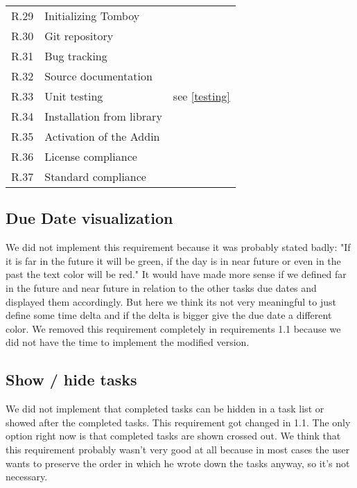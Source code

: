 \begin{tabular}{lll}
\completed	R.29	& Initializing Tomboy & \\
\completed	R.30	& Git repository & \\
\completed	R.31	& Bug tracking & \\
\completed	R.32	& Source documentation & \\
\parts		R.33	& Unit testing & see \ref{testing}\\
\completed	R.34	& Installation from library & \\
\completed	R.35	& Activation of the Addin & \\
\completed	R.36	& License compliance & \\
\completed	R.37	& Standard compliance & \\
\end{tabular}


\subsection{Due Date visualization}
\label{visualduedate}
We did not implement this requirement because it was probably stated badly:
"If it is far in the future it will be green, if the day is in near future or even in the past the text color will be red."
It would have made more sense if we defined far in the future and near future in relation to the other tasks due dates and displayed them accordingly. But here we think its not very meaningful to just define some time delta and if the delta is bigger give the due date a different color. We removed this requirement completely in requirements 1.1 because we did not have the time to implement the modified version.

\subsection{Show / hide tasks}
\label{showhidetasks}
We did not implement that completed tasks can be hidden in a task list or showed after the completed tasks. This requirement got changed in 1.1. The only option right now is that completed tasks are shown crossed out. We think that this requirement probably wasn't very good at all because in most cases the user wants to preserve the order in which he wrote down the tasks anyway, so it's not necessary.

